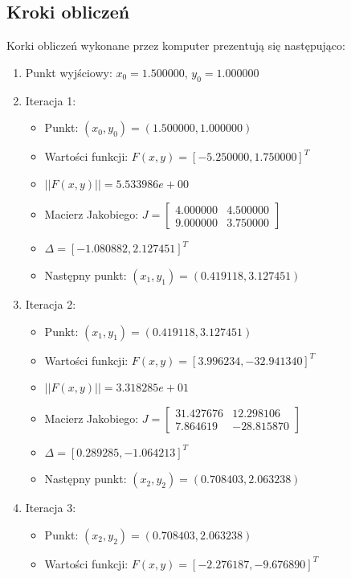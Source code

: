 \documentclass[a4paper,12pt]{article}
\begin{document}
\subsection*{Kroki obliczeń}

Korki obliczeń wykonane przez komputer prezentują się następująco:

\begin{enumerate}
\item Punkt wyjściowy: $x_0 = 1.500000$, $y_0 = 1.000000$
\item Iteracja 1:
  \begin{itemize}
    \item Punkt: $(x_0, y_0) = (1.500000, 1.000000)$
    \item Wartości funkcji: $F(x,y) = [-5.250000, 1.750000]^T$
    \item $||F(x,y)|| = 5.533986e+00$
    \item Macierz Jakobiego: $J = \begin{bmatrix} 4.000000 & 4.500000 \\ 9.000000 & 3.750000 \end{bmatrix}$
    \item $\Delta = [-1.080882, 2.127451]^T$
    \item Następny punkt: $(x_1, y_1) = (0.419118, 3.127451)$
  \end{itemize}
\item Iteracja 2:
  \begin{itemize}
    \item Punkt: $(x_1, y_1) = (0.419118, 3.127451)$
    \item Wartości funkcji: $F(x,y) = [3.996234, -32.941340]^T$
    \item $||F(x,y)|| = 3.318285e+01$
    \item Macierz Jakobiego: $J = \begin{bmatrix} 31.427676 & 12.298106 \\ 7.864619 & -28.815870 \end{bmatrix}$
    \item $\Delta = [0.289285, -1.064213]^T$
    \item Następny punkt: $(x_2, y_2) = (0.708403, 2.063238)$
  \end{itemize}
\item Iteracja 3:
  \begin{itemize}
    \item Punkt: $(x_2, y_2) = (0.708403, 2.063238)$
    \item Wartości funkcji: $F(x,y) = [-2.276187, -9.676890]^T$

\end{itemize}
\end{enumerate}
\end{document}
